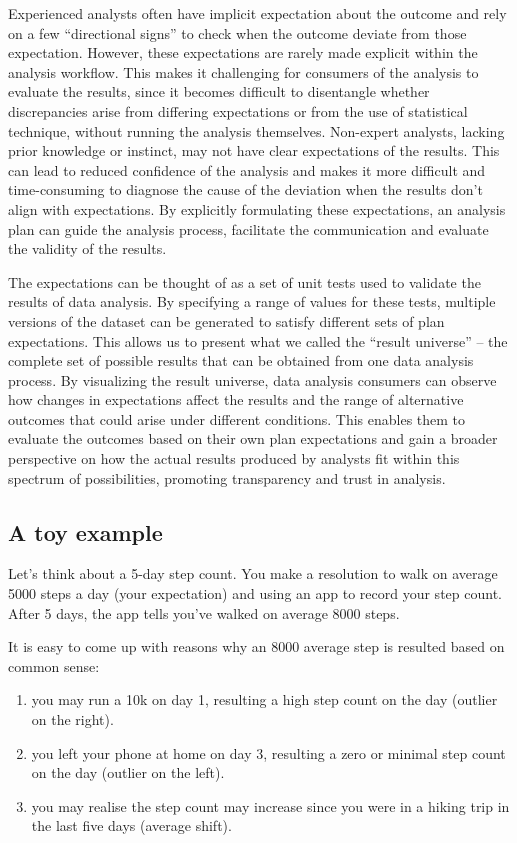 \documentclass[
]{jds}
\providecommand{\tightlist}{%
  \setlength{\itemsep}{0pt}\setlength{\parskip}{0pt}}\usepackage{longtable,booktabs,array}
\begin{document}
Experienced analysts often have implicit expectation about the outcome
and rely on a few ``directional signs'' to check when the outcome
deviate from those expectation. However, these expectations are rarely
made explicit within the analysis workflow. This makes it challenging
for consumers of the analysis to evaluate the results, since it becomes
difficult to disentangle whether discrepancies arise from differing
expectations or from the use of statistical technique, without running
the analysis themselves. Non-expert analysts, lacking prior knowledge or
instinct, may not have clear expectations of the results. This can lead
to reduced confidence of the analysis and makes it more difficult and
time-consuming to diagnose the cause of the deviation when the results
don't align with expectations. By explicitly formulating these
expectations, an analysis plan can guide the analysis process,
facilitate the communication and evaluate the validity of the results.

The expectations can be thought of as a set of unit tests used to
validate the results of data analysis. By specifying a range of values
for these tests, multiple versions of the dataset can be generated to
satisfy different sets of plan expectations. This allows us to present
what we called the ``result universe'' -- the complete set of possible
results that can be obtained from one data analysis process. By
visualizing the result universe, data analysis consumers can observe how
changes in expectations affect the results and the range of alternative
outcomes that could arise under different conditions. This enables them
to evaluate the outcomes based on their own plan expectations and gain a
broader perspective on how the actual results produced by analysts fit
within this spectrum of possibilities, promoting transparency and trust
in analysis.

\subsection{A toy example}\label{a-toy-example}

Let's think about a 5-day step count. You make a resolution to walk on
average 5000 steps a day (your expectation) and using an app to record
your step count. After 5 days, the app tells you've walked on average
8000 steps.

It is easy to come up with reasons why an 8000 average step is resulted
based on common sense:

\begin{enumerate}
\def\labelenumi{\arabic{enumi}.}
\tightlist
\item
  you may run a 10k on day 1, resulting a high step count on the day
  (outlier on the right).
\item
  you left your phone at home on day 3, resulting a zero or minimal step
  count on the day (outlier on the left).
\item
  you may realise the step count may increase since you were in a hiking
  trip in the last five days (average shift).
\end{enumerate}
\end{document}
